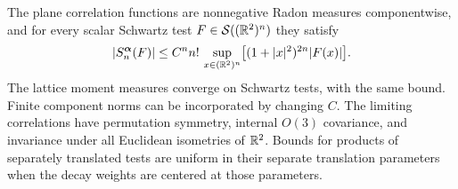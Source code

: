 \begin{proposition}
\label{prop:euclidean-regularity}
The plane correlation functions are nonnegative Radon measures
componentwise, and for every scalar Schwartz test
$F\in\mathcal S((\mathbb R^2)^n)$ they satisfy
\begin{equation}
 |S_n^{\boldsymbol\alpha}(F)|
   \le C^n n!\,
       \sup_{x\in(\mathbb R^2)^n}
         \bigl[(1+|x|^2)^{2n}|F(x)|\bigr].
 \label{eq:orig-35}
\end{equation}
The lattice moment measures converge on Schwartz tests, with the same
bound.  Finite component norms can be incorporated by changing $C$.
The limiting correlations have permutation symmetry, internal $O(3)$
covariance, and invariance under all Euclidean isometries of $\mathbb R^2$.
Bounds for products of separately translated tests are uniform in
their separate translation parameters when the decay weights are
centered at those parameters.
\end{proposition}

